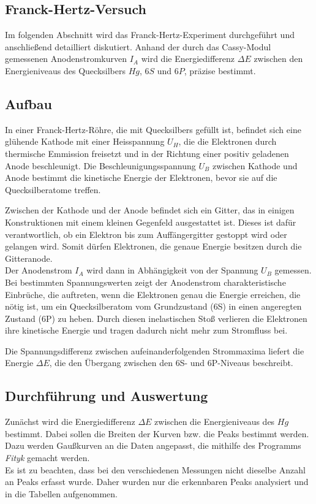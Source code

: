 \documentclass{article}
\begin{document}
\begin{multicols}{2}
\clearpage
\section{Franck-Hertz-Versuch}
Im folgenden Abschnitt wird das Franck-Hertz-Experiment durchgeführt und anschließend detailliert 
diskutiert. Anhand der durch das Cassy-Modul gemessenen Anodenstromkurven \( I_A \) wird die 
Energiedifferenz \( \Delta E \) zwischen den Energieniveaus des Quecksilbers $Hg$, \( 6S \) und \( 6P \), 
präzise bestimmt.
\subsection{Aufbau}
In einer Franck-Hertz-Röhre, die mit Quecksilbers gefüllt ist, befindet sich eine glühende 
Kathode mit einer Heisspannung $U_H$, die die Elektronen durch thermische Emmission freisetzt und in der 
Richtung einer positiv geladenen Anode beschleunigt. Die Beschleunigungsspannung $U_B$ zwischen Kathode 
und Anode bestimmt die kinetische Energie der Elektronen, bevor sie auf die Quecksilberatome treffen.

Zwischen der Kathode und der Anode befindet sich ein Gitter, das in einigen Konstruktionen mit einem kleinen 
Gegenfeld ausgestattet ist. Dieses ist dafür verantwortlich, ob ein Elektron bis zum Auffängergitter 
gestoppt wird oder gelangen wird. Somit dürfen Elektronen, die genaue Energie besitzen
durch die Gitteranode. 
\\Der Anodenstrom $I_A$
wird dann in Abhängigkeit von der Spannung $U_B$ gemessen. Bei bestimmten Spannungswerten zeigt 
der Anodenstrom charakteristische Einbrüche, die auftreten, wenn die Elektronen genau die Energie 
erreichen, die nötig ist, um ein Quecksilberatom vom Grundzustand (6S) in einen angeregten 
Zustand (6P) zu heben.
 Durch diesen inelastischen Stoß verlieren die Elektronen ihre kinetische Energie und tragen dadurch nicht mehr zum Stromfluss bei.

Die Spannungsdifferenz zwischen aufeinanderfolgenden Strommaxima liefert die Energie $\Delta E$, die den 
Übergang zwischen den 6S- und 6P-Niveaus beschreibt. 
\subsection{Durchführung und Auswertung}
Zunächst wird die Energiedifferenz $\Delta E$ zwischen die Energieniveaus des $Hg$ bestimmt. 
Dabei sollen die Breiten der Kurven bzw. die Peaks bestimmt werden. Dazu werden Gaußkurven an die Daten angepasst,
die mithilfe des Programms \textit{Fityk} gemacht werden.
\\ Es ist zu beachten, dass bei den verschiedenen Messungen nicht dieselbe Anzahl an Peaks 
erfasst wurde. Daher wurden nur die erkennbaren Peaks analysiert und in die Tabellen 
aufgenommen. 

\end{multicols}
\end{document}
